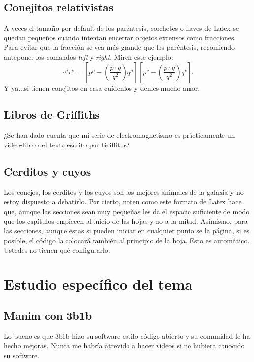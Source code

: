 \documentclass[letter,twoside,12pt]{book}
\begin{document}
\section{Conejitos relativistas}\label{sec:pdf}
A veces el tamaño por default de los paréntesis, corchetes o llaves de Latex se quedan pequeños cuando intentan encerrar objetos extensos como fracciones. Para evitar que la fracción se vea más grande que los paréntesis, recomiendo anteponer los comandos \textit{left} y \textit{right}. Miren este ejemplo:
\begin{equation}
    r^{\mu}r^{\nu}=\left[p^{\mu}-\left(\frac{p\cdot q}{q^2}\right)q^{\mu}\right]
    \left[p^{\nu}-\left(\frac{p\cdot q}{q^2}\right)q^{\nu}\right].
\end{equation} \label{W1}
Y ya...si tienen conejitos en casa cuídenlos y denles mucho amor.

\section{Libros de Griffiths} \label{sec:cono}
¿Se han dado cuenta que mi serie de electromagnetismo es prácticamente un video-libro del texto  escrito por Griffiths?
\section{Cerditos y cuyos}\label{sec:suma}
Los conejos, los cerditos y los cuyos son los mejores animales de la galaxia y no estoy dispuesto a debatirlo. Por cierto, noten como este formato de Latex hace que, aunque las secciones sean muy pequeñas les da el espacio suficiente de modo que los capítulos empiecen al inicio de las hojas y no a la mitad. Asimismo, para las secciones, aunque estas si pueden iniciar en cualquier punto se la página, si es posible, el código la colocará también al principio de la hoja. Esto es automático. Ustedes no tienen qué configurarlo. 


\chapter{Estudio específico del tema} \label{cap3}

\section{Manim con 3b1b}\label{sec:int}

Lo bueno es que 3b1b hizo su software estilo código abierto y su comunidad le ha hecho mejoras. Nunca me habría atrevido a hacer videos si no hubiera conocido su software.
\end{document}
